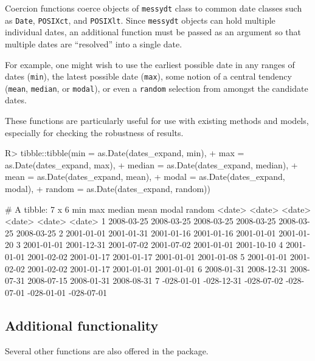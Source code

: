 \documentclass[
]{jss}
\begin{document}
Coercion functions coerce objects of \texttt{messydt} class to common
date classes such as \texttt{Date}, \texttt{POSIXct}, and
\texttt{POSIXlt}. Since \texttt{messydt} objects can hold multiple
individual dates, an additional function must be passed as an argument
so that multiple dates are ``resolved'' into a single date.

For example, one might wish to use the earliest possible date in any
ranges of dates (\texttt{min}), the latest possible date (\texttt{max}),
some notion of a central tendency (\texttt{mean}, \texttt{median}, or
\texttt{modal}), or even a \texttt{random} selection from amongst the
candidate dates.

These functions are particularly useful for use with existing methods
and models, especially for checking the robustness of results.

\begin{CodeChunk}
\begin{CodeInput}
R> tibble::tibble(min = as.Date(dates_expand, min),
+                max = as.Date(dates_expand, max),
+                median = as.Date(dates_expand, median),
+                mean = as.Date(dates_expand, mean),
+                modal = as.Date(dates_expand, modal),
+                random = as.Date(dates_expand, random))
\end{CodeInput}
\begin{CodeOutput}
# A tibble: 7 x 6
  min        max        median     mean       modal      random    
  <date>     <date>     <date>     <date>     <date>     <date>    
1 2008-03-25 2008-03-25 2008-03-25 2008-03-25 2008-03-25 2008-03-25
2 2001-01-01 2001-01-31 2001-01-16 2001-01-16 2001-01-01 2001-01-20
3 2001-01-01 2001-12-31 2001-07-02 2001-07-02 2001-01-01 2001-10-10
4 2001-01-01 2001-02-02 2001-01-17 2001-01-17 2001-01-01 2001-01-08
5 2001-01-01 2001-02-02 2001-02-02 2001-01-17 2001-01-01 2001-01-01
6 2008-01-31 2008-12-31 2008-07-31 2008-07-15 2008-01-31 2008-08-31
7 -028-01-01 -028-12-31 -028-07-02 -028-07-01 -028-01-01 -028-07-01
\end{CodeOutput}
\end{CodeChunk}

\hypertarget{additional-functionality}{%
\subsection{Additional functionality}\label{additional-functionality}}

Several other functions are also offered in the 
package.
\end{document}
